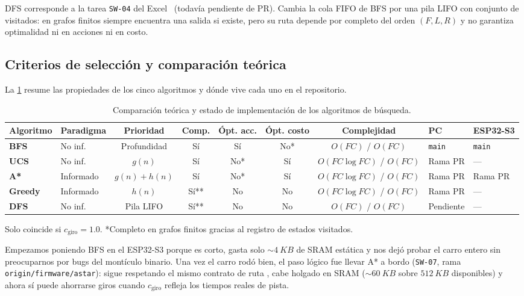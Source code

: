 DFS corresponde a la tarea \texttt{SW-04} del Excel~\cite{excel2026organizacion} (todavía pendiente de PR). Cambia la cola FIFO de BFS por una pila LIFO con conjunto de visitados: en grafos finitos siempre encuentra una salida si existe, pero su ruta depende por completo del orden $(F, L, R)$ y no garantiza optimalidad ni en acciones ni en costo.

\subsection{Criterios de selección y comparación teórica}
\label{subsec:comparacion-teorica}

La \cref{tab:comparacion-algoritmos} resume las propiedades de los cinco algoritmos y dónde vive cada uno en el repositorio.

\begin{table}[H]
  \centering
  \caption{Comparación teórica y estado de implementación de los algoritmos de búsqueda.}
  \label{tab:comparacion-algoritmos}
  \scriptsize
  \setlength{\tabcolsep}{4pt}
  \begin{tabularx}{\textwidth}{@{}>{\bfseries}l l c c c c c l l@{}}
    \toprule
    Algoritmo & Paradigma & Prioridad & Comp. & Ópt. acc. & Ópt. costo & Complejidad & PC & ESP32-S3 \\
    \midrule
    BFS & No inf. & Profundidad & Sí & Sí & No* & $O(FC)$ / $O(FC)$ & \texttt{main} & \texttt{main} \\
    UCS & No inf. & $g(n)$ & Sí & No* & Sí & $O(FC\log FC)$ / $O(FC)$ & Rama PR & --- \\
    A* & Informado & $g(n)+h(n)$ & Sí & No* & Sí & $O(FC\log FC)$ / $O(FC)$ & Rama PR & Rama PR \\
    Greedy & Informado & $h(n)$ & Sí** & No & No & $O(FC\log FC)$ / $O(FC)$ & Rama PR & --- \\
    DFS & No inf. & Pila LIFO & Sí** & No & No & $O(FC)$ / $O(FC)$ & Pendiente & --- \\
    \bottomrule
  \end{tabularx}
  \vspace{2pt}
  \begin{flushleft}
    \footnotesize *Solo coincide si $c_{\text{giro}} = 1.0$. \quad **Completo en grafos finitos gracias al registro de estados visitados.
  \end{flushleft}
\end{table}

Empezamos poniendo BFS en el ESP32-S3 porque es corto, gasta solo $\sim\SI{4}{KB}$ de SRAM estática y nos dejó probar el carro entero sin preocuparnos por bugs del montículo binario. Una vez el carro rodó bien, el paso lógico fue llevar A* a bordo (\texttt{SW-07}, rama \texttt{origin/firmware/astar}): sigue respetando el mismo contrato de ruta , cabe holgado en SRAM ($\sim\SI{60}{KB}$ sobre $\SI{512}{KB}$ disponibles) y ahora sí puede ahorrarse giros cuando $c_{\text{giro}}$ refleja los tiempos reales de pista.

